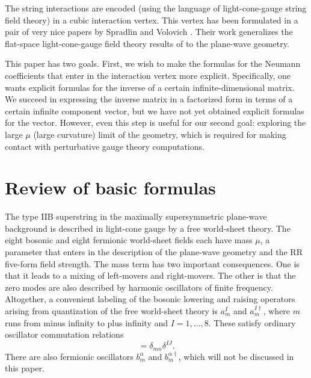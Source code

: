 \documentclass[a4paper,12pt]{article}
\begin{document}
The string interactions are encoded (using the language of
light-cone-gauge string field theory) in a cubic interaction
vertex. This vertex has been formulated in a pair of very nice
papers by Spradlin and Volovich \cite{Spradlin:2002ar}
\cite{Spradlin:2002rv}. Their work generalizes the flat-space
light-cone-gauge field theory results of \cite{Green:1982tc}
\cite{Green:hw} to the plane-wave geometry.

This paper has two goals. First, we wish to make the formulas for
the Neumann coefficients that enter in the interaction vertex more
explicit. Specifically, one wants explicit formulas for the
inverse of a certain infinite-dimensional matrix. We succeed in
expressing the inverse matrix in a factorized form in terms of a
certain infinite component vector, but we have not yet obtained
explicit formulas for the vector. However, even this step is
useful for our second goal: exploring the large $\mu$ (large
curvature) limit of the geometry, which is required for making
contact with perturbative gauge theory computations.

\section{Review of basic formulas}

The type IIB superstring in the maximally supersymmetric
plane-wave background is described in light-cone gauge by a free
world-sheet theory. The eight bosonic and eight fermionic
world-sheet fields each have mass $\mu$, a parameter that enters
in the description of the plane-wave geometry and the RR five-form
field strength. The mass term has two important consequences. One
is that it leads to a mixing of left-movers and right-movers. The
other is that the zero modes are also described by harmonic
oscillators of finite frequency. Altogether, a convenient labeling
of the bosonic lowering and raising operators arising from
quantization of the free world-sheet theory is $a_m^I$ and $a_m^{I
\dagger}$, where $m$ runs from minus infinity to plus infinity and
$I = 1,\ldots,8$. These satisfy ordinary oscillator commutation
relations
\begin{equation}
[a_m^I, a_n^{J \dagger}] = \delta_{mn} \delta^{IJ}.
\end{equation}
There are also fermionic oscillators $b_m^{\alpha}$ and
$b_m^{\alpha \dagger}$, which will not be discussed in this paper.
\end{document}
